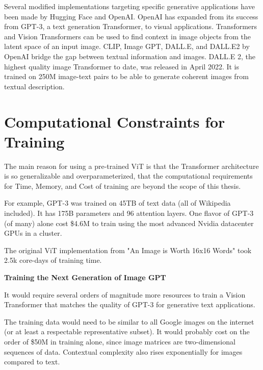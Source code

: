 Several modified implementations targeting specific generative applications have been made by Hugging Face and OpenAI.
OpenAI has expanded from its success from GPT-3, a text generation Transformer, to visual applications.
Transformers and Vision Transformers can be used to find context in image objects from the latent space of an input image.
CLIP, Image GPT, DALL.E, and DALL.E2 by OpenAI bridge the gap between textual information and images.
DALL.E 2, the highest quality image Transformer to date, was released in April 2022.
It is trained on 250M image-text pairs to be able to generate coherent images from textual description. \citep{Dalle2}



\section{Computational Constraints for Training}


The main reason for using a pre-trained ViT is that the Transformer architecture is so generalizable and 
overparameterized, that the computational requirements for Time, Memory, and Cost of training 
are beyond the scope of this thesis. 


For example, GPT-3 was trained on 45TB of text data (all of Wikipedia included). It has 175B parameters and 96 attention layers. \citep{GPT3}
One flavor of GPT-3 (of many) alone cost \$4.6M to train using the most advanced Nvidia datacenter GPUs in a cluster.

The original ViT implementation from "An Image is Worth 16x16 Words" took 2.5k core-days of training time. \citep{dosovitskiy2020vit} 

\vspace{10mm}

\textbf{Training the Next Generation of Image GPT}

It would require several orders of magnitude more resources to train a Vision Transformer that matches the quality of GPT-3 
for generative text applications.

The training data would need to be similar to all Google images on the internet (or at least a respectable representative subset).
It would probably cost on the order of \$50M in training alone, since image matrices are two-dimensional sequences of data.
Contextual complexity also rises exponentially for images compared to text.










